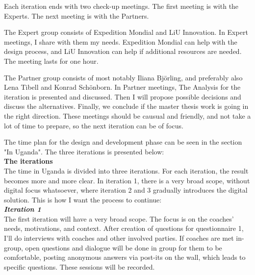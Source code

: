 Each iteration ends with two check-up meetings. The first meeting is with the Experts. The next meeting is with the Partners.

The Expert group consists of Expedition Mondial and LiU Innovation. In Expert meetings, I share with them my needs. Expedition Mondial can help with the design process, and LiU Innovation can help if additional resources are needed. The meeting lasts for one hour.

The Partner group consists of most notably Iliana Björling, and preferably also Lena Tibell and Konrad Schönborn. In Partner meetings, The Analysis for the iteration is presented and discussed. Then I will propose possible decisions and discuss the alternatives. %
Finally, we conclude if the master thesis work is going in the right direction. These meetings should be causual and friendly, and not take a lot of time to prepare, so the next iteration can be of focus. %

The time plan for the design and development phase can be seen in the section "In Uganda". The three iterations is presented below: \\

\textbf{The iterations} \\
The time in Uganda is divided into three iterations. For each iteration, the result becomes more and more clear. In iteration 1, there is a very broad scope, without digital focus whatsoever, where iteration 2 and 3 gradually introduces the digital solution. This is how I want the process to continue:\\

	\textit{\textbf{Iteration 1}}\\
    The first iteration will have a very broad scope. The focus is on the coaches' needs, motivations, and context.  After creation of questions for questionnaire 1, I'll do interviews with coaches and other involved parties. If coaches are met in-group, open questions and dialogue will be done in group for them to be comfortable, posting anonymous answers via post-its on the wall, which leads to specific questions. These sessions will be recorded.


